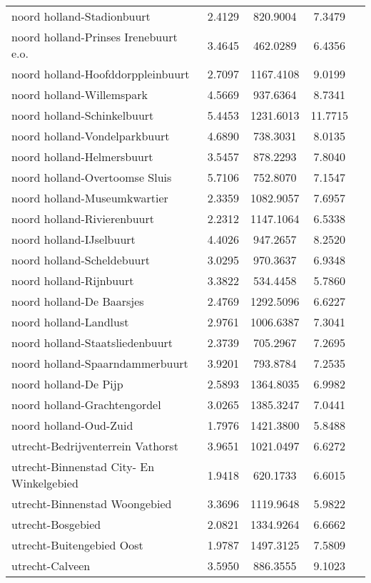 \begin{longtable}{llccc}
noord holland-Stadionbuurt & 2.4129 & 820.9004 & 7.3479 \\
noord holland-Prinses Irenebuurt e.o. & 3.4645 & 462.0289 & 6.4356 \\
noord holland-Hoofddorppleinbuurt & 2.7097 & 1167.4108 & 9.0199 \\
noord holland-Willemspark & 4.5669 & 937.6364 & 8.7341 \\
noord holland-Schinkelbuurt & 5.4453 & 1231.6013 & 11.7715 \\
noord holland-Vondelparkbuurt & 4.6890 & 738.3031 & 8.0135 \\
noord holland-Helmersbuurt & 3.5457 & 878.2293 & 7.8040 \\
noord holland-Overtoomse Sluis & 5.7106 & 752.8070 & 7.1547 \\
noord holland-Museumkwartier & 2.3359 & 1082.9057 & 7.6957 \\
noord holland-Rivierenbuurt & 2.2312 & 1147.1064 & 6.5338 \\
noord holland-IJselbuurt & 4.4026 & 947.2657 & 8.2520 \\
noord holland-Scheldebuurt & 3.0295 & 970.3637 & 6.9348 \\
noord holland-Rijnbuurt & 3.3822 & 534.4458 & 5.7860 \\
noord holland-De Baarsjes & 2.4769 & 1292.5096 & 6.6227 \\
noord holland-Landlust & 2.9761 & 1006.6387 & 7.3041 \\
noord holland-Staatsliedenbuurt & 2.3739 & 705.2967 & 7.2695 \\
noord holland-Spaarndammerbuurt & 3.9201 & 793.8784 & 7.2535 \\
noord holland-De Pijp & 2.5893 & 1364.8035 & 6.9982 \\
noord holland-Grachtengordel & 3.0265 & 1385.3247 & 7.0441 \\
noord holland-Oud-Zuid & 1.7976 & 1421.3800 & 5.8488 \\
utrecht-Bedrijventerrein Vathorst & 3.9651 & 1021.0497 & 6.6272 \\
utrecht-Binnenstad City- En Winkelgebied & 1.9418 & 620.1733 & 6.6015 \\
utrecht-Binnenstad Woongebied & 3.3696 & 1119.9648 & 5.9822 \\
utrecht-Bosgebied & 2.0821 & 1334.9264 & 6.6662 \\
utrecht-Buitengebied Oost & 1.9787 & 1497.3125 & 7.5809 \\
utrecht-Calveen & 3.5950 & 886.3555 & 9.1023 \\

\end{longtable}
